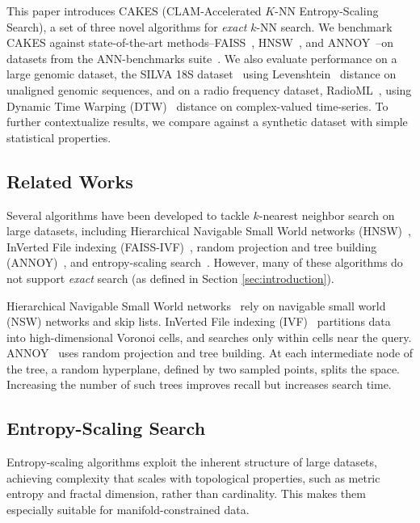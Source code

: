 This paper introduces CAKES (CLAM-Accelerated $K$-NN Entropy-Scaling Search), a set of three novel algorithms for \emph{exact} $k$-NN search.
We benchmark CAKES against state-of-the-art methods--FAISS~\cite{johnson2019billion}, HNSW~\cite{malkov2016hnsw}, and ANNOY~\cite{annoy}--on datasets from the ANN-benchmarks suite~\cite{aumuller2020ann}.
We also evaluate performance on a large genomic dataset, the SILVA 18S dataset~\cite{10.1093/nar/gks1219} using Levenshtein~\cite{levenshtein1966binary} distance on unaligned genomic sequences, and on a radio frequency dataset, RadioML~\cite{oshea2018radioml}, using Dynamic Time Warping (DTW)~\cite{gold2018dynamic} distance on complex-valued time-series.
To further contextualize results, we compare against a synthetic dataset with simple statistical properties.


\subsection{Related Works}
\label{sec:intoduction:related-works}

Several algorithms have been developed to tackle $k$-nearest neighbor search on large datasets, including Hierarchical Navigable Small World networks (HNSW)~\cite{malkov2016hnsw}, InVerted File indexing (FAISS-IVF)~\cite{faissivf}, random projection and tree building (ANNOY)~\cite{annoy}, and entropy-scaling search~\cite{yu2015entropy, ishaq2019clustered}.
However, many of these algorithms do not support \emph{exact} search (as defined in Section \ref{sec:introduction}).

Hierarchical Navigable Small World networks~\cite{malkov2016hnsw} rely on navigable small world (NSW) networks and skip lists.
InVerted File indexing (IVF)~\cite{faissivf, sacks1987multikey, kent1990signature} partitions data into high-dimensional Voronoi cells, and searches only within cells near the query.
ANNOY~\cite{annoy} uses random projection and tree building.
At each intermediate node of the tree, a random hyperplane, defined by two sampled points, splits the space.
Increasing the number of such trees improves recall but increases search time.


\subsection{Entropy-Scaling Search}
\label{sec:intoduction:entropy-scaling-search}

Entropy-scaling algorithms exploit the inherent structure of large datasets, achieving complexity that scales with topological properties, such as metric entropy and fractal dimension, rather than cardinality.
This makes them especially suitable for manifold-constrained data.

